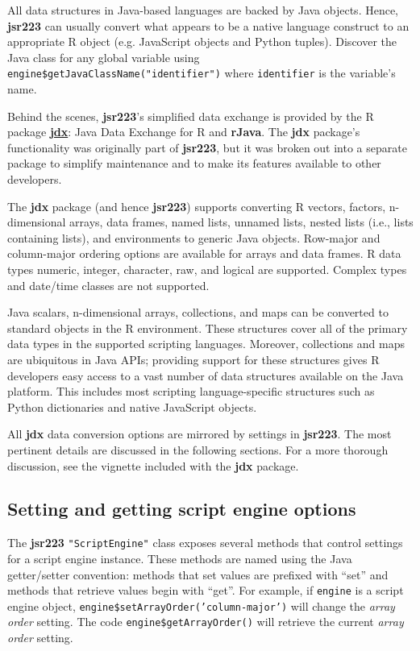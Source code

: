 \documentclass[
article,
11pt, %
a4paper, %
oneside, %
headinclude,footinclude, %
]{scrartcl}
\theoremstyle{definition} %
\theoremstyle{plain} %
\theoremstyle{remark} %
\newcommand{\pkg}[1]{\textbf{#1}}
\newcommand{\CRANpkg}[1]{\href{https://CRAN.R-project.org/package=#1}{\pkg{#1}}}
\newcommand{\code}[1]{\texttt{#1}}
\begin{document}
All data structures in Java-based languages are backed by Java objects. Hence, \pkg{jsr223} can usually convert what appears to be a native language construct to an appropriate R object (e.g. JavaScript objects and Python tuples). Discover the Java class for any global variable using  \code{engine\$getJavaClassName("identifier")} where \code{identifier} is the variable's name.

Behind the scenes, \pkg{jsr223}'s simplified data exchange is provided by the R package \CRANpkg{jdx}: Java Data Exchange for R and \pkg{rJava}. The \pkg{jdx} package's functionality was originally part of \pkg{jsr223}, but it was broken out into a separate package to simplify maintenance and to make its features available to other developers.

The \pkg{jdx} package (and hence \pkg{jsr223}) supports converting R vectors, factors, n-dimensional arrays, data frames, named lists, unnamed lists, nested lists (i.e., lists containing lists), and environments to generic Java objects. Row-major and column-major ordering options are available for arrays and data frames. R data types numeric, integer, character, raw, and logical are supported. Complex types and date/time classes are not supported.

Java scalars, n-dimensional arrays, collections, and maps can be converted to standard objects in the R environment. These structures cover all of the primary data types in the supported scripting languages. Moreover, collections and maps are ubiquitous in Java APIs; providing support for these structures gives R developers easy access to a vast number of data structures available on the Java platform. This includes most scripting language-specific structures such as Python dictionaries and native JavaScript objects.

All \pkg{jdx} data conversion options are mirrored by settings in \pkg{jsr223}. The most pertinent details are discussed in the following sections. For a more thorough discussion, see the vignette included with the \pkg{jdx} package.

\subsection{Setting and getting script engine options}

The \pkg{jsr223} \code{"ScriptEngine"} class exposes several methods that control settings for a script engine instance. These methods are named using the Java getter/setter convention: methods that set values are prefixed with ``set'' and methods that retrieve values begin with ``get''. For example, if \code{engine} is a script engine object, \code{engine\$setArrayOrder('column-major')} will change the \textit{array order} setting. The code \code{engine\$getArrayOrder()} will retrieve the current \textit{array order} setting.
\end{document}
